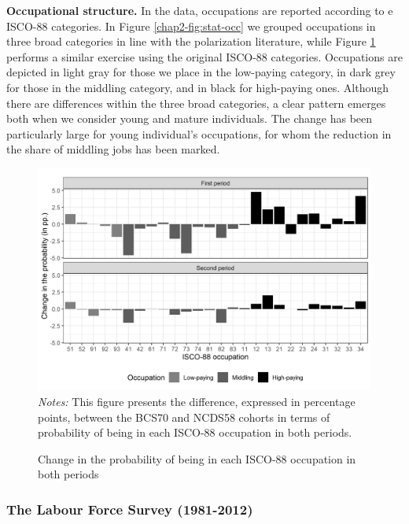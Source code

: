 \textbf{Occupational structure.} In the data, occupations are reported according to e ISCO-88 categories. In Figure \ref{chap2-fig:stat-occ} we grouped occupations in three broad categories in line with the polarization literature, while Figure \ref{chap2-fig:polarize-isco88-both} performs a similar exercise using the original ISCO-88 categories. Occupations are depicted in light gray for those we place in the low-paying category, in dark grey for those in the middling category, and in black for high-paying ones. Although there are differences within the three broad categories, a clear pattern emerges both when we consider young and mature individuals. The change has been particularly large for young individual's occupations, for whom the reduction in the share of middling jobs has been marked. 

\begin{figure}[!htb]
     \centering
     \caption{Change in the probability of being in each ISCO-88 occupation in both periods}
     \label{chap2-fig:polarize-isco88-both}
     \includegraphics[width=\linewidth]{chap2/graphic/polarize-isco88-both.png}
 	\vspace{-3em}
 	\justify\singlespacing\footnotesize{\textit{Notes:} This figure presents the difference, expressed in percentage points, between the BCS70 and NCDS58 cohorts in terms of probability of being in each ISCO-88 occupation in both periods.}
\end{figure}


\subsubsection{The Labour Force Survey (1981-2012)}\label{chap2-app-data-LFS}

